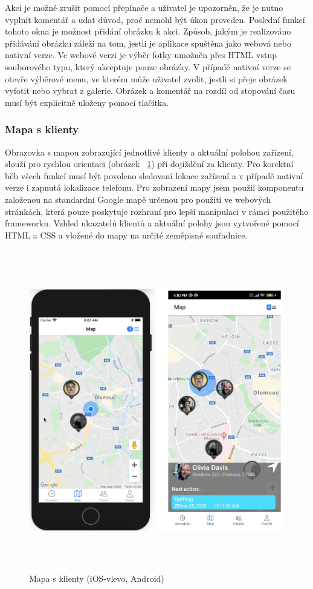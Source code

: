 \documentclass[
  glossaries,
]{kidiplom}
\begin{document}
Akci je možné zrušit pomocí přepínače a uživatel je upozorněn, že je nutno vyplnit komentář a udat důvod, proč nemohl být úkon proveden. Poslední funkcí tohoto okna je možnost přidání obrázku k akci. Způsob, jakým je realizováno přidávání obrázku záleží na tom, jestli je aplikace spuštěna jako webová nebo nativní verze. Ve webové verzi je výběr fotky umožněn přes HTML vstup souborového typu, který akceptuje pouze obrázky. V případě nativní verze se otevře výběrové menu, ve kterém může uživatel zvolit, jestli si přeje obrázek vyfotit nebo vybrat z galerie. Obrázek a komentář na rozdíl od stopování času musí být explicitně uloženy pomocí tlačítka. 

\subsubsection{Mapa s klienty}
Obrazovka s mapou zobrazující jednotlivé klienty a aktuální polohou zařízení, slouží pro rychlou orientaci (obrázek ~\ref{fig:mapClients}) při dojíždění za klienty. Pro korektní běh všech funkcí musí být povoleno sledovaní lokace zařízení a v případě nativní verze i zapnutá lokalizace telefonu. Pro zobrazení mapy jsem použil komponentu založenou na standardní Google mapě určenou pro použití ve webových stránkách, která pouze poskytuje rozhraní pro lepší manipulaci v rámci použitého frameworku. Vzhled ukazatelů klientů a aktuální polohy jsou vytvořené pomocí HTML a CSS a vložené do mapy na určité zeměpisné souřadnice.

\begin{figure}[H]
  	\centering
 	 \includegraphics[width=14cm,height=14cm,keepaspectratio]{map}
 	 \caption{Mapa s klienty (iOS-vlevo, Android)}
 	 \label{fig:mapClients}
\end{figure}
\end{document}
